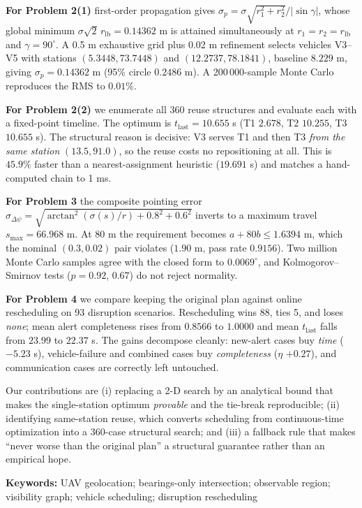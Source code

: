 \documentclass[12pt]{article}
\begin{document}
\textbf{For Problem 2(1)} first-order propagation gives $\sigma_p=\sigma\sqrt{r_1^2+r_2^2}/|\sin\gamma|$, whose global minimum $\sigma\sqrt2\,r_{\mathrm{lb}}=0.14362$ m is attained simultaneously at $r_1=r_2=r_{\mathrm{lb}}$ and $\gamma=90^\circ$. A 0.5 m exhaustive grid plus 0.02 m refinement selects vehicles V3--V5 with stations $(5.3448,73.7448)$ and $(12.2737,78.1841)$, baseline $8.229$ m, giving $\sigma_p=0.14362$ m (95\% circle $0.2486$ m). A 200\,000-sample Monte Carlo reproduces the RMS to $0.01\%$.

\textbf{For Problem 2(2)} we enumerate all 360 reuse structures and evaluate each with a fixed-point timeline. The optimum is $t_{\mathrm{last}}=10.655$ s (T1 $2.678$, T2 $10.255$, T3 $10.655$ s). The structural reason is decisive: V3 serves T1 and then T3 \emph{from the same station} $(13.5,91.0)$, so the reuse costs no repositioning at all. This is $45.9\%$ faster than a nearest-assignment heuristic ($19.691$ s) and matches a hand-computed chain to 1 ms.

\textbf{For Problem 3} the composite pointing error $\sigma_{\Delta\psi}=\sqrt{\arctan^2(\sigma(s)/r)+0.8^2+0.6^2}$ inverts to a maximum travel $s_{\max}=66.968$ m. At $80$ m the requirement becomes $a+80b\le1.6394$ m, which the nominal $(0.3,0.02)$ pair violates ($1.90$ m, pass rate $0.9156$). Two million Monte Carlo samples agree with the closed form to $0.0069^\circ$, and Kolmogorov--Smirnov tests ($p=0.92$, $0.67$) do not reject normality.

\textbf{For Problem 4} we compare keeping the original plan against online rescheduling on 93 disruption scenarios. Rescheduling wins 88, ties 5, and loses \emph{none}; mean alert completeness rises from $0.8566$ to $1.0000$ and mean $t_{\mathrm{last}}$ falls from $23.99$ to $22.37$ s. The gains decompose cleanly: new-alert cases buy \emph{time} ($-5.23$ s), vehicle-failure and combined cases buy \emph{completeness} ($\eta$ $+0.27$), and communication cases are correctly left untouched.

Our contributions are (i) replacing a 2-D search by an analytical bound that makes the single-station optimum \emph{provable} and the tie-break reproducible; (ii) identifying same-station reuse, which converts scheduling from continuous-time optimization into a 360-case structural search; and (iii) a fallback rule that makes ``never worse than the original plan'' a structural guarantee rather than an empirical hope.

\vspace{4pt}
{\footnotesize\noindent\textbf{Keywords:} UAV geolocation; bearings-only intersection; observable region; visibility graph; vehicle scheduling; disruption rescheduling}
\endgroup
\end{document}
